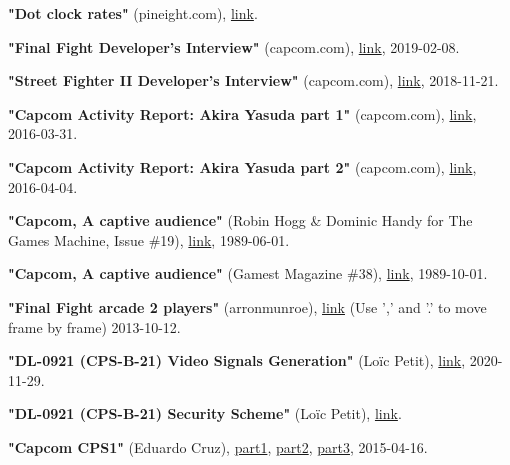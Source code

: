 \begin{thebibliography}{999}
  \textbf{"Dot clock rates"} (pineight.com),
  \href{https://pineight.com/mw/page/Dot_clock_rates.xhtml}{link}.

  \textbf{"Final Fight Developer's Interview"} (capcom.com),
  \href{https://game.capcom.com/cfn/sfv/column/132673?lang=en}{link},
  2019-02-08.

  \textbf{"Street Fighter II Developer's Interview"} (capcom.com),
  \href{https://game.capcom.com/cfn/sfv/column/132595?lang=en}{link},
  2018-11-21.

  \textbf{"Capcom Activity Report: Akira Yasuda part 1"} (capcom.com),
  \href{https://game.capcom.com/cfn/sfv/column/112429}{link},
  2016-03-31.

  \textbf{"Capcom Activity Report: Akira Yasuda part 2"} (capcom.com),
  \href{https://game.capcom.com/cfn/sfv/column/112432}{link},
  2016-04-04.

  \textbf{"Capcom, A captive audience"} (Robin Hogg \& Dominic Handy for The Games Machine, Issue \#19),
  \href{https://archive.org/details/the-games-machine-19/page/n23/mode/2up}{link},
  1989-06-01.

  \textbf{"Capcom, A captive audience"} (Gamest Magazine \#38),
  \href{https://retrocdn.net/images/9/91/Gamest_JP_038.pdf}{link},
  1989-10-01.

  \textbf{"Final Fight arcade 2 players"} (arronmunroe),
  \href{https://youtu.be/HyAHGHo22Og?t=1707}{link} (Use ',' and '.' to move frame by frame)
  2013-10-12.

  \textbf{"DL-0921 (CPS-B-21) Video Signals Generation"} (Lo\"{i}c Petit),
  \href{https://gitlab.com/loic.petit/cps2-reverse/-/blob/master/DLs/DL-0921/doc/video-signals.md}{link},
  2020-11-29.

  \textbf{"DL-0921 (CPS-B-21) Security Scheme"} (Lo\"{i}c Petit),
  \href{https://gitlab.com/loic.petit/cps2-reverse/-/blob/master/DLs/DL-0921/doc/security-scheme.md}{link}.

  \textbf{"Capcom CPS1"} (Eduardo Cruz),
  \href{http://arcadehacker.blogspot.com/2015/04/capcom-cps1-part-1.html}{part1},
  \href{http://arcadehacker.blogspot.com/2015/05/capcom-cps1-part-2.html}{part2},
  \href{http://arcadehacker.blogspot.com/2015/06/capcom-cps1-part-3.html}{part3},
  2015-04-16.
  

\end{thebibliography}
